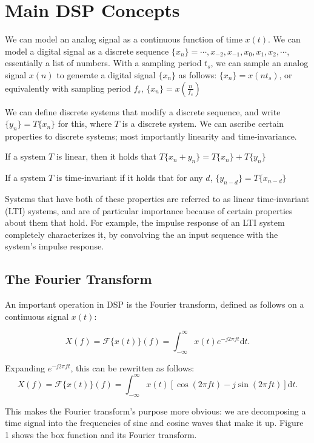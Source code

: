 \documentclass[12pt]{article}
\begin{document}
\section*{Main DSP Concepts}

We can model an analog signal as a continuous function of time $x(t)$. We can model a digital signal as a discrete sequence $\{x_n\} = \cdots, x_{-2}, x_{-1}, x_0, x_1, x_2, \cdots$, essentially a list of numbers.  With a sampling period $t_s$, we can sample an analog signal $x(n)$ to generate a digital signal $\{x_n\}$ as follows: $\{x_n\} = x(nt_s)$, or equivalently with sampling period  $f_s$, $\{x_n\} = x(\frac{n}{f_s})$

We can define discrete systems that modify a discrete sequence, and write $\{y_n\} = T\{x_n\}$ for this, where $T$ is a discrete system. We can ascribe certain properties to discrete systems; most importantly linearity and time-invariance.

If a system $T$ is linear, then it holds that $T\{x_n + y_n\} = T\{x_n\} + T\{y_n\}$

If a system $T$ is time-invariant if it holds that for any $d$, $\{y_{n-d}\} = T\{x_{n-d}\}$

Systems that have both of these properties are referred to as linear time-invariant (LTI) systems, and are of particular importance because of certain properties about them that hold. For example, the impulse response of an LTI system completely characterizes it, by convolving the an input sequence with the system's impulse response.

\subsection*{The Fourier Transform}

An important operation in DSP is the Fourier transform, defined as follows on a continuous signal $x(t)$:

\[
  X(f) = \mathcal{F}\{x(t)\}(f) = \int_{-\infty}^\infty x(t)e^{-j 2 \pi f t} \mathrm{d}t
.\] 

Expanding $e^{-j2\pi f t}$, this can be rewritten as follows:
\[
  X(f) = \mathcal{F}\{x(t)\}(f) =  \int_{-\infty}^\infty x(t)\left[\cos(2\pi f t) - j\sin(2\pi f t)\right] \mathrm{d}t
.\] 

This makes the Fourier transform's purpose more obvious: we are decomposing a time signal into the frequencies of sine and cosine waves that make it up. Figure 1 shows the box function and its Fourier transform.
\end{document}
